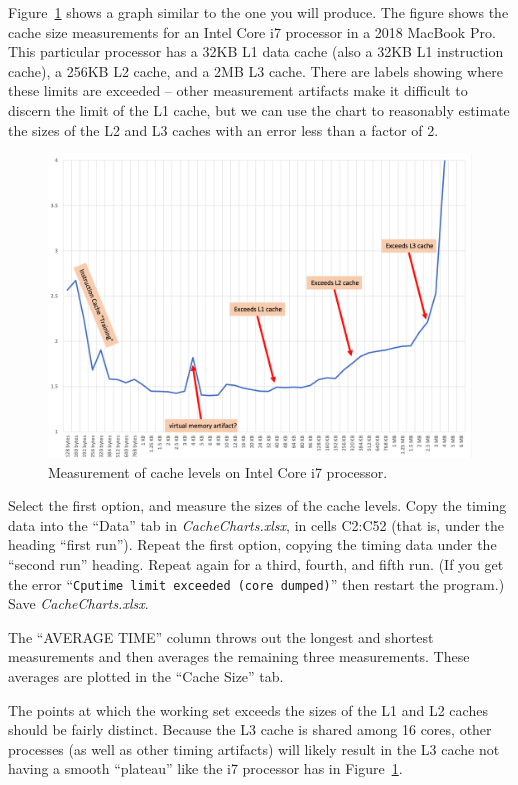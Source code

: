 Figure~\ref{fig:LaptopCache} shows a graph similar to the one you will
produce. The figure shows the cache size measurements for an Intel Core i7
processor in a 2018 MacBook Pro. This particular processor has a 32KB L1 data
cache (also a 32KB L1 instruction cache), a 256KB L2 cache, and a 2MB L3 cache.
There are labels showing where these limits are exceeded -- other measurement
artifacts make it difficult to discern the limit of the L1 cache, but we can use
the chart to reasonably estimate the sizes of the L2 and L3 caches with an error
less than a factor of 2.

\begin{figure}
    \centering
    \includegraphics[width=13cm]{IntelI7caches}
    \caption{Measurement of cache levels on Intel Core i7 processor. \label{fig:LaptopCache}}
\end{figure}

Select the first option, and measure the sizes of the cache levels. Copy the
timing data into the ``Data'' tab in \textit{CacheCharts.xlsx}, in cells C2:C52
(that is, under the heading ``first run''). Repeat the first option, copying
the timing data under the ``second run'' heading. Repeat again for a third,
fourth, and fifth run. (If you get the error ``\texttt{Cputime limit exceeded
(core dumped)}'' then restart the program.) Save \textit{CacheCharts.xlsx}.

The ``AVERAGE TIME'' column throws out the longest and shortest measurements
and then averages the remaining three measurements. These averages are plotted
in the ``Cache Size'' tab.

The points at which the working set exceeds the sizes of the L1 and L2 caches
should be fairly distinct. Because the L3 cache is shared among 16 cores, other
processes (as well as other timing artifacts) will likely result in the L3
cache not having a smooth ``plateau'' like the i7 processor has in
Figure~\ref{fig:LaptopCache}.

